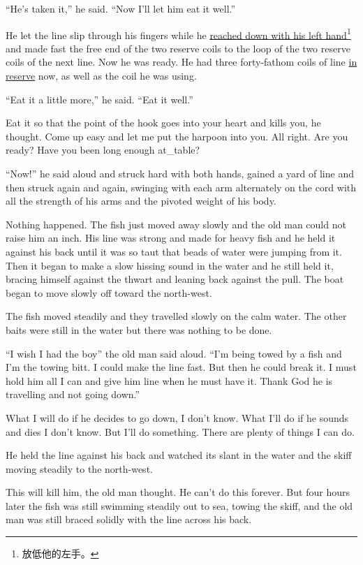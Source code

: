 \documentclass[fontset=ubuntu,zihao=-4]{ctexrep}
\begin{document}
``He's taken it,'' he said. ``Now I'll let him eat it well.''

He let the line slip through his fingers while he \uline{reached down with
  his left hand}\footnote{放低他的左手。} and made fast the free end of the
two reserve coils to the loop of the two reserve coils of the next line. Now
he was ready. He had three forty-fathom coils of line \uline{in reserve} now,
as well as the coil he was using.

``Eat it a little more,'' he said. ``Eat it well.''

Eat it so that the point of the hook goes into your heart and kills you, he
thought. Come up easy and let me put the harpoon into you. All right. Are
you ready? Have you been long enough \gls{at_table}?

``Now!'' he said aloud and struck hard with both hands, \gls{gained} a yard
of line and then struck again and again, swinging with each arm
\gls{alternately} on the cord with all the strength of his arms and the
\gls{pivoted} weight of his body.

Nothing happened. The fish just moved away slowly and the old man could not
raise him an \gls{inch}. His line was strong and made for heavy fish and he
held it against his back until it was so taut that \glspl{bead} of
water were jumping from it. Then it began to make a slow hissing sound in
the water and he still held it, \gls{bracing} himself against the thwart and
leaning back against the pull. The boat began to move slowly off toward the
north-west.

The fish moved steadily and they travelled slowly on the \gls{calm} water. The
other baits were still in the water but there was nothing to be done.

``I wish I had the boy'' the old man said aloud. ``I'm being \gls{towed} by
a fish and I'm the towing \gls{bitt}. I could make the line fast. But then
he could break it. I must hold him all I can and give him line when he must
have it. Thank God he is travelling and not going down.''

What I will do if he decides to go down, I don't know. What I'll do if he
sounds and dies I don't know. But I'll do something. There are \gls{plenty} of
things I can do.

He held the line against his back and watched its slant in the water and the
skiff moving steadily to the north-west.

This will kill him, the old man thought. He can't do this forever. But four
hours later the fish was still swimming steadily out to sea, towing the
skiff, and the old man was still \gls{braced} \gls{solidly} with the line
across his back.
\end{document}
